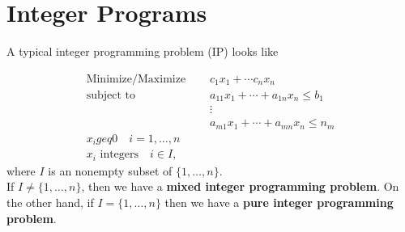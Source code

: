 \section{Integer Programs}

A typical integer programming problem (IP) looks like

\begin{align*}
    \text{Minimize/Maximize } \quad & c_1x_1 + \cdots c_n x_n                 \\
    \text{subject to } \quad        & a_{11}x_1 + \cdots + a_{1n}x_n \leq b_1 \\
                                    & \vdots                                  \\
                                    & a_{m1}x_1 + \cdots + a_{mn}x_n \leq n_m \\
    x_i geq 0 \quad i = 1, \dots, n                                           \\
    x_i \text{ integers} \quad i \in I,
\end{align*}
where \(I\) is an nonempty subset of \(\{1, \dots, n\}\). \\

If \(I \neq \{1, \dots, n\}\), then we have a \textbf{mixed integer programming problem}. On the other hand, if \(I = \{1, \dots, n\}\) then we have a \textbf{pure integer programming problem}.


